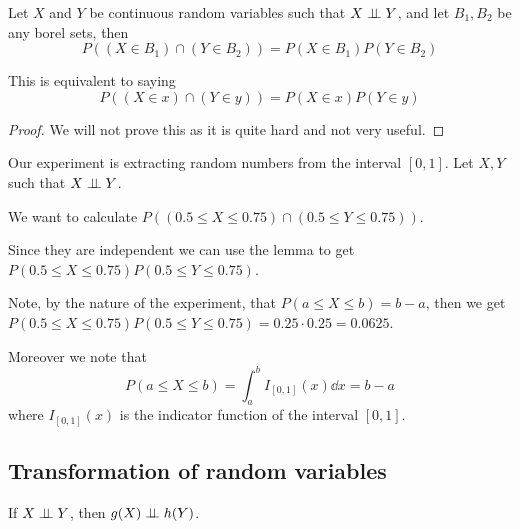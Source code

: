 \documentclass[14pt]{extarticle}
\begin{document}
\begin{lemma}
    \label{lem:independent_random_variables}
    Let $X$ and $Y$ be continuous random variables such that $X \perp \!\!\! \perp Y$, and let $B_1, B_2$ be any borel sets, then
    \begin{equation}
        P\left((X \in B_1) \cap (Y \in B_2)\right) = P(X \in B_1) P(Y \in B_2)
    \end{equation}

    This is equivalent to saying
    \begin{equation}
        P\left((X \in x) \cap (Y \in y)\right) = P(X \in x) P(Y \in y)
    \end{equation}
\end{lemma}

\begin{proof}
    We will not prove this as it is quite hard and not very useful.
\end{proof}

\begin{example}
    Our experiment is extracting random numbers from the interval $[0, 1]$.
    Let $X, Y$ such that $X \perp \!\!\! \perp Y$.

    We want to calculate $P\left((0.5 \leq X \leq 0.75) \cap (0.5 \leq Y \leq 0.75)\right)$.

    Since they are independent we can use the lemma to get $P(0.5 \leq X \leq 0.75) P(0.5 \leq Y \leq 0.75)$.

    Note, by the nature of the experiment, that $P(a \leq X \leq b) = b - a$, then we get
    $P(0.5 \leq X \leq 0.75) P(0.5 \leq Y \leq 0.75) = 0.25 \cdot 0.25 = 0.0625$.

    Moreover we note that
    \begin{equation}
        P(a \leq X \leq b) = \int_a^b I_{[0,1]}(x) \dd{x} = b - a
    \end{equation}
    where $I_{[0,1]}(x)$ is the indicator function of the interval $[0, 1]$.
\end{example}

\subsection{Transformation of random variables}

\begin{proposition}
    \label{prop:transformation_indep_crv}

    If $X \perp \!\!\! \perp Y$, then $g(X) \perp \!\!\! \perp h(Y)$.
\end{proposition}
\end{document}
